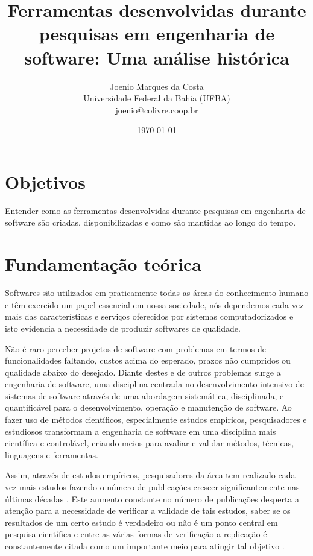 \documentclass[12pt]{article}
\title{
  Ferramentas desenvolvidas durante pesquisas em engenharia de software:
  Uma análise histórica
}
\author{Joenio Marques da Costa\\
  {\small Universidade Federal da Bahia (UFBA)} \\
  {\small joenio@colivre.coop.br}
}
\date{\today}
\begin{document}
\maketitle

\section{Objetivos}

Entender como as ferramentas desenvolvidas durante pesquisas em engenharia de
software são criadas, disponibilizadas e como são mantidas ao longo do tempo.

\section{Fundamentação teórica}

Softwares são utilizados em praticamente todas as áreas do conhecimento humano
e têm exercido um papel essencial em nossa sociedade, nós dependemos cada vez
mais das características e serviços oferecidos por sistemas computadorizados
\cite{Mafra2006} e isto evidencia a necessidade de produzir softwares de
qualidade.

Não é raro perceber projetos de software com problemas em termos de
funcionalidades faltando, custos acima do esperado, prazos não cumpridos ou
qualidade abaixo do desejado.  Diante destes e de outros problemas surge a
engenharia de software, uma disciplina centrada no desenvolvimento intensivo
de sistemas de software \cite{Wohlin2012} através de uma abordagem
sistemática, disciplinada, e quantificável para o desenvolvimento, operação e
manutenção \cite{SWEBOK2014} de software. Ao fazer uso de métodos científicos,
especialmente estudos empíricos, pesquisadores e estudiosos transformam a
engenharia de software em uma disciplina mais científica e controlável,
criando meios para avaliar e validar métodos, técnicas, linguagens e
ferramentas.

Assim, através de estudos empíricos, pesquisadores da área tem realizado cada
vez mais estudos fazendo o número de publicações crescer significantemente nas
últimas décadas \cite{Stol2015}. Este aumento constante no número de
publicações desperta a atenção para a necessidade de verificar a validade de tais estudos,
saber se os resultados de um certo estudo é verdadeiro ou não é um ponto
central em pesquisa científica e entre as várias formas de verificação a
replicação é constantemente citada como um importante meio para atingir tal
objetivo \cite{Almqvist2006}.
\end{document}
